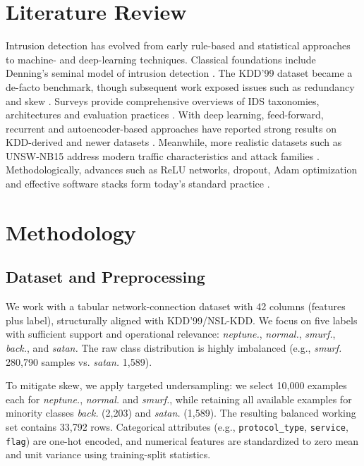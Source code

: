 \documentclass[conference]{IEEEtran}
\begin{document}
\section{Literature Review}
Intrusion detection has evolved from early rule-based and statistical approaches to machine- and deep-learning techniques. Classical foundations include Denning's seminal model of intrusion detection \cite{denning1987intrusion}. The KDD'99 dataset became a de-facto benchmark, though subsequent work exposed issues such as redundancy and skew \cite{tavallaee2009detailed}. Surveys provide comprehensive overviews of IDS taxonomies, architectures and evaluation practices \cite{liao2013intrusion}. With deep learning, feed-forward, recurrent and autoencoder-based approaches have reported strong results on KDD-derived and newer datasets \cite{shone2018deep,yin2017deep,javaid2016deep}. Meanwhile, more realistic datasets such as UNSW-NB15 address modern traffic characteristics and attack families \cite{moustafa2015unsw}. Methodologically, advances such as ReLU networks, dropout, Adam optimization and effective software stacks form today’s standard practice \cite{lecun2015deep,srivastava2014dropout,kingma2015adam,pedregosa2011scikit}.

\section{Methodology}
\subsection{Dataset and Preprocessing}
We work with a tabular network-connection dataset with 42 columns (features plus label), structurally aligned with KDD'99/NSL-KDD. We focus on five labels with sufficient support and operational relevance: \textit{neptune.}, \textit{normal.}, \textit{smurf.}, \textit{back.}, and \textit{satan.} The raw class distribution is highly imbalanced (e.g., \textit{smurf.} 280{,}790 samples vs. \textit{satan.} 1{,}589).

To mitigate skew, we apply targeted undersampling: we select 10{,}000 examples each for \textit{neptune.}, \textit{normal.} and \textit{smurf.}, while retaining all available examples for minority classes \textit{back.} (2{,}203) and \textit{satan.} (1{,}589). The resulting balanced working set contains 33{,}792 rows. Categorical attributes (e.g., \texttt{protocol\_type}, \texttt{service}, \texttt{flag}) are one-hot encoded, and numerical features are standardized to zero mean and unit variance using training-split statistics.
\end{document}

